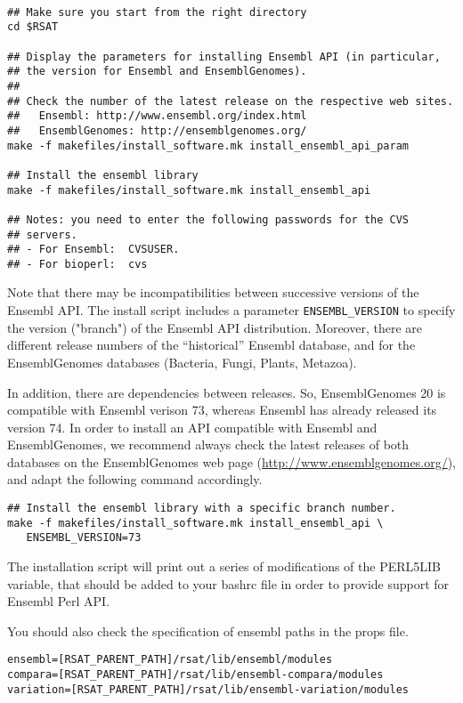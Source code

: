 \documentclass[12pt,a4paper, oneside]{scrreprt} %
\begin{document}
\begin{lstlisting}

## Make sure you start from the right directory
cd $RSAT

## Display the parameters for installing Ensembl API (in particular,
## the version for Ensembl and EnsemblGenomes).
##
## Check the number of the latest release on the respective web sites. 
##   Ensembl: http://www.ensembl.org/index.html
##   EnsemblGenomes: http://ensemblgenomes.org/
make -f makefiles/install_software.mk install_ensembl_api_param

## Install the ensembl library
make -f makefiles/install_software.mk install_ensembl_api 

## Notes: you need to enter the following passwords for the CVS
## servers.
## - For Ensembl:  CVSUSER.
## - For bioperl:  cvs

\end{lstlisting}


Note that there may be incompatibilities between successive versions
of the Ensembl API. The install script includes a parameter
\texttt{ENSEMBL\_VERSION} to specify the version ("branch") of the
Ensembl API distribution.  Moreover, there are different release
numbers of the ``historical'' Ensembl database, and for the
EnsemblGenomes databases (Bacteria, Fungi, Plants, Metazoa).

In addition, there are dependencies between releases. So,
EnsemblGenomes 20 is compatible with Ensembl verison 73, whereas
Ensembl has already released its version 74. In order to install an
API compatible with Ensembl and EnsemblGenomes, we recommend always
check the latest releases of both databases on the EnsemblGenomes web
page (\url{http://www.ensemblgenomes.org/}), and adapt the following
command accordingly.

\begin{lstlisting}
## Install the ensembl library with a specific branch number.
make -f makefiles/install_software.mk install_ensembl_api \
   ENSEMBL_VERSION=73
\end{lstlisting}

The installation script will print out a series of modifications of
the PERL5LIB variable, that should be added to your bashrc file in
order to provide support for Ensembl Perl API.

You should also check the specification of ensembl paths in the props
file.

\begin{lstlisting}
ensembl=[RSAT_PARENT_PATH]/rsat/lib/ensembl/modules
compara=[RSAT_PARENT_PATH]/rsat/lib/ensembl-compara/modules
variation=[RSAT_PARENT_PATH]/rsat/lib/ensembl-variation/modules
\end{lstlisting}
\end{document}
